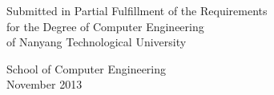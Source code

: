 \begin{titlepage}
\begin{center}
\vspace{14 mm}
\begin{center} \large
Submitted in Partial Fulfillment of the Requirements\\ 
for the Degree of Computer Engineering\\
of Nanyang Technological University
\end{center}

\vfill


\begin{center}
School of Computer Engineering \\
November 2013
\end{center}

\end{center}
\end{titlepage}